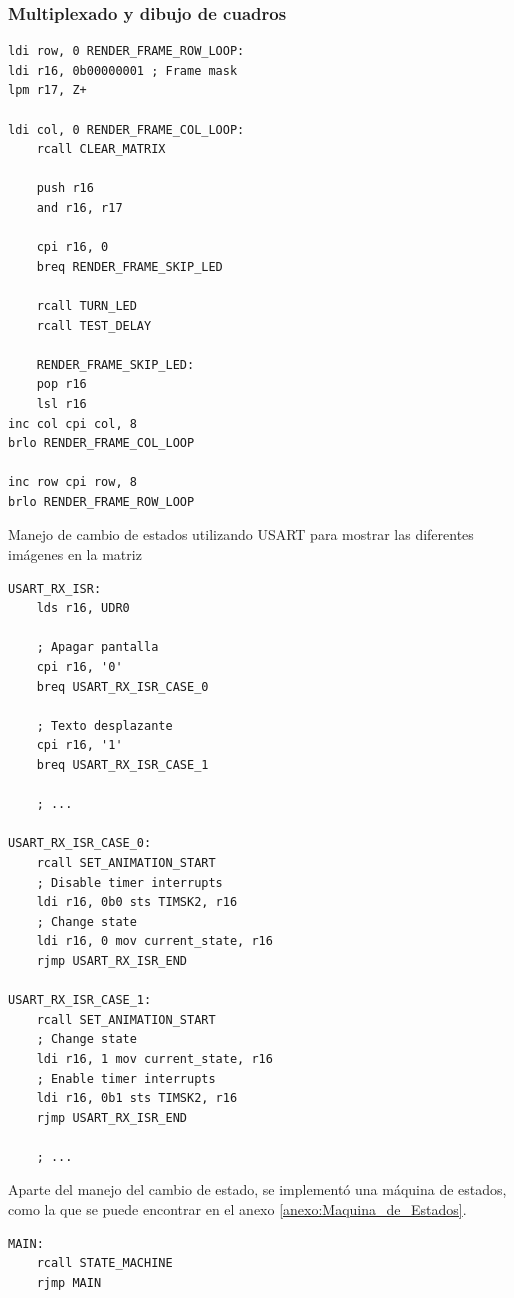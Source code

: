 \subsubsection{Multiplexado y dibujo de cuadros}
\begin{verbatim}
ldi row, 0 RENDER_FRAME_ROW_LOOP:  
ldi r16, 0b00000001 ; Frame mask
lpm r17, Z+

ldi col, 0 RENDER_FRAME_COL_LOOP:
    rcall CLEAR_MATRIX

    push r16
    and r16, r17

    cpi r16, 0 
    breq RENDER_FRAME_SKIP_LED

    rcall TURN_LED
    rcall TEST_DELAY

    RENDER_FRAME_SKIP_LED:
    pop r16
    lsl r16
inc col cpi col, 8 
brlo RENDER_FRAME_COL_LOOP 

inc row cpi row, 8 
brlo RENDER_FRAME_ROW_LOOP
\end{verbatim}

Manejo de cambio de estados utilizando USART para mostrar las diferentes imágenes en la matriz

\begin{verbatim}
USART_RX_ISR:	
    lds r16, UDR0

    ; Apagar pantalla
    cpi r16, '0' 
    breq USART_RX_ISR_CASE_0 

    ; Texto desplazante
    cpi r16, '1' 
    breq USART_RX_ISR_CASE_1 

    ; ...

USART_RX_ISR_CASE_0:
    rcall SET_ANIMATION_START
    ; Disable timer interrupts
    ldi r16, 0b0 sts TIMSK2, r16 
    ; Change state
    ldi r16, 0 mov current_state, r16   
    rjmp USART_RX_ISR_END

USART_RX_ISR_CASE_1:
    rcall SET_ANIMATION_START
    ; Change state
    ldi r16, 1 mov current_state, r16   
    ; Enable timer interrupts
    ldi r16, 0b1 sts TIMSK2, r16 
    rjmp USART_RX_ISR_END

    ; ...
\end{verbatim}

\newpage

Aparte del manejo del cambio de estado, se implementó una máquina de estados, como la que se puede encontrar en el anexo \ref{anexo:Maquina_de_Estados}.

\begin{verbatim}
MAIN:
    rcall STATE_MACHINE
    rjmp MAIN
\end{verbatim}


